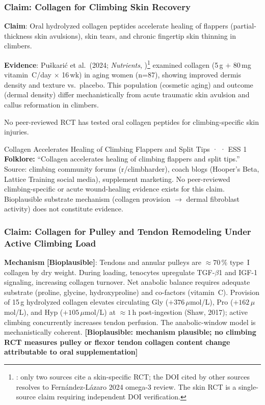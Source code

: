 \subsubsection{Claim: Collagen for Climbing Skin Recovery}

\textbf{Claim}: Oral hydrolyzed collagen peptides accelerate healing of flappers (partial-thickness skin avulsions), skin tears, and chronic fingertip skin thinning in climbers.

\textbf{Evidence}: Puškarić et al.\ (2024; \textit{Nutrients}, \cite{FLAGA+24})\footnote{\toverify: only two sources cite a skin-specific RCT; the DOI cited by other sources resolves to Fernández-Lázaro 2024 omega-3 review. The skin RCT is a single-source claim requiring independent DOI verification.} examined collagen (5\,g $+$ 80\,mg vitamin~C/day $\times$ 16\,wk) in aging women (n=87), showing improved dermis density and texture vs.\ placebo. This population (cosmetic aging) and outcome (dermal density) differ mechanistically from acute traumatic skin avulsion and callus reformation in climbers.

No peer-reviewed RCT has tested oral collagen peptides for climbing-specific skin injuries.

\begin{folklorebox}{Collagen Accelerates Healing of Climbing Flappers and Split Tips · \folkloreverified · ESS 1}
\textbf{Folklore:} ``Collagen accelerates healing of climbing flappers and split tips.'' Source: climbing community forums (r/climbharder), coach blogs (Hooper's Beta, Lattice Training social media), supplement marketing. No peer-reviewed climbing-specific or acute wound-healing evidence exists for this claim. Bioplausible substrate mechanism (collagen provision $\to$ dermal fibroblast activity) does not constitute evidence.
\end{folklorebox}

\subsubsection{Claim: Collagen for Pulley and Tendon Remodeling Under Active Climbing Load}

\textbf{Mechanism} \textbf{[Bioplausible]}: Tendons and annular pulleys are ${\approx}70\,\%$ type~I collagen by dry weight. During loading, tenocytes upregulate TGF-$\beta$1 and IGF-1 signaling, increasing collagen turnover. Net anabolic balance requires adequate substrate (proline, glycine, hydroxyproline) and co-factors (vitamin~C). Provision of 15\,g hydrolyzed collagen elevates circulating Gly ($+376$\,$\mu$mol/L), Pro ($+162$\,$\mu$mol/L), and Hyp ($+105$\,$\mu$mol/L) at ${\approx}1$\,h post-ingestion (Shaw, 2017); active climbing concurrently increases tendon perfusion. The anabolic-window model is mechanistically coherent. \textbf{[Bioplausible: mechanism plausible; no climbing RCT measures pulley or flexor tendon collagen content change attributable to oral supplementation]}

